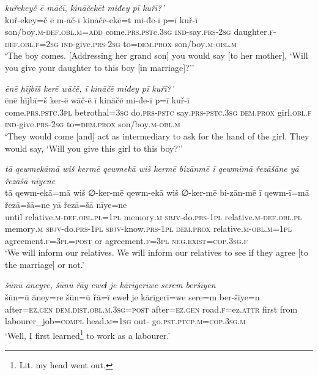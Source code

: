 \ea \label{ŽE.75}
\textit{kuřekeyč ē māčī, kināčekēt miđey pī kuřī?’} \\ 
\gll kuř-ekey=č ē m-āč-ī kināčē-ekē=t mi-đe-ī p=ī kuř-ī \\ 
 son/boy\textsc{.m}\textsc{-def}\textsc{.obl}\textsc{.m}\textsc{=add} come\textsc{.prs}\textsc{.pst}c\textsc{.3sg} \textsc{ind-}say\textsc{.prs}-\textsc{2sg} daughter\textsc{.f}\textsc{-def}\textsc{.obl}\textsc{.f}\textsc{=\textsc{2sg}} \textsc{ind-}give\textsc{.prs}-\textsc{2sg} to=\textsc{dem.prox} son/boy\textsc{.m}\textsc{-obl}\textsc{.m} \\ 
\glt `The boy comes. [Addressing her grand son] you would say [to her mother], ‘Will you give your daughter to this boy [in marriage]?’'
\z 
 
\ea \label{ŽE.80}
\textit{ēnē hījbīš kerē wāčē, ī kināčē miđey pī kuřī?’} \\ 
\gll ēnē hījbī=š ker-ē wāč-ē ī kināčē mi-đe-ī p=ī kuř-ī \\ 
 come\textsc{.prs}\textsc{.pstc}\textsc{.3pl} betrothal\textsc{=3sg} do\textsc{.prs}\textsc{-pstc} say\textsc{.prs-pstc}\textsc{.3sg} \textsc{dem.prox} girl\textsc{.obl}\textsc{.f} \textsc{ind-}give\textsc{.prs}-\textsc{2sg} to=\textsc{dem.prox} son/boy\textsc{.m}\textsc{-obl}\textsc{.m} \\ 
\glt `They would come [and] act as intermediary to ask for the hand of the girl. They would say, ‘Will you give this girl to this boy?’'
\z 
 
\ea \label{ŽE.83}
\textit{tā qewmekāmā wiš kermē qewmekā wiš kermē bizānmē ī qewmīmā řezāšāne yā řezāšā nīyene} \\ 
\gll tā qewm-ekā=mā wiš ∅-ker-mē qewm-ekā wiš ∅-ker-mē bi-zān-mē ī qewm-ī=mā řezā=šā=ne yā řezā=šā nīye=ne \\ 
 until relative\textsc{.m}\textsc{-def}\textsc{.obl}\textsc{.pl}\textsc{=1pl} memory\textsc{.m} \textsc{sbjv-}do\textsc{.prs}\textsc{-1pl} relative\textsc{.m}\textsc{-def}\textsc{.obl}\textsc{.pl} memory\textsc{.m} \textsc{sbjv-}do\textsc{.prs}\textsc{-1pl} \textsc{sbjv-}know\textsc{.prs}\textsc{-1pl} \textsc{dem.prox} relative\textsc{.m}\textsc{-obl}\textsc{.m}\textsc{=1pl} agreement\textsc{.f}\textsc{=3pl}\textsc{=\textsc{post}} or agreement\textsc{.f}\textsc{=3pl} \textsc{\textsc{neg.}exist}\textsc{=cop}\textsc{.3sg}\textsc{.f} \\ 
\glt `We will inform our relatives. We will inform our relatives to see if they agree [to the  marriage] or not.'
\z 
 
\ea \label{ŽM.4}
\textit{šūnū āneyre, šūnū řāy eweɫ je kārīgerīwe serem beršīyen} \\ 
\gll šūn=ū āney=re šūn=ū řā=ī eweɫ je kārīgerī=we sere=m ber-šīye=n \\ 
 after\textsc{=ez.gen} \textsc{dem.dist}\textsc{.obl}\textsc{.m}\textsc{.3sg}\textsc{=\textsc{post}} after\textsc{=ez.gen} road\textsc{.f}=ez.\textsc{attr} first from labourer\_job\textsc{=compl} head\textsc{.m}\textsc{=\textsc{1sg}} out- go\textsc{.pst}\textsc{.ptcp}\textsc{.m}\textsc{=cop}\textsc{.3sg}\textsc{.m} \\ 
\glt `Well, I first learned\footnote{Lit. my head went out.}  to work as a labourer.'
\z 
 
